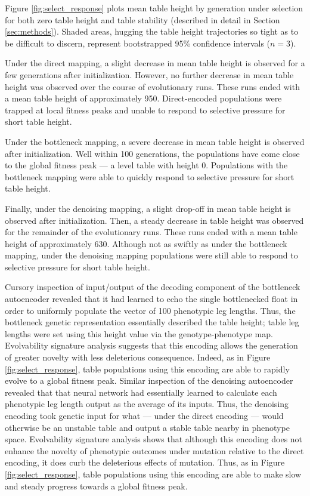 

Figure \ref{fig:select_response} plots mean table height by generation under selection for both zero table height and table stability (described in detail in Section \ref{sec:methods}).
Shaded areas, hugging the table height trajectories so tight as to be difficult to discern, represent bootstrapped 95\% confidence intervals ($n=3$).

Under the direct mapping, a slight decrease in mean table height is observed for a few generations after initialization.
However, no further decrease in mean table height was observed over the course of evolutionary runs.
These runs ended with a mean table height of approximately 950.
Direct-encoded populations were trapped at local fitness peaks and unable to respond to selective pressure for short table height.

Under the bottleneck mapping, a severe decrease in mean table height is observed after initialization.
Well within 100 generations, the populations have come close to the global fitness peak --- a level table with height 0.
Populations with the bottleneck mapping were able to quickly respond to selective pressure for short table height.

Finally, under the denoising mapping, a slight drop-off in mean table height is observed after initialization.
Then, a steady decrease in table height was observed for the remainder of the evolutionary runs.
These runs ended with a mean table height of approximately 630.
Although not as swiftly as under the bottleneck mapping, under the denoising mapping populations were still able to respond to selective pressure for short table height.

Cursory inspection of input/output of the decoding component of the bottleneck autoencoder revealed that it had learned to echo the single bottlenecked float in order to uniformly populate the vector of 100 phenotypic leg lengths.
Thus, the bottleneck genetic representation essentially described the table height; table leg lengths were set using this height value via the genotype-phenotype map.
Evolvability signature analysis suggests that this encoding allows the generation of greater novelty with less deleterious consequence.
Indeed, as in Figure \ref{fig:select_response}, table populations using this encoding are able to rapidly evolve to a global fitness peak.
Similar inspection of the denoising autoencoder revealed that that neural network had essentially learned to calculate each phenotypic leg length output as the average of its inputs.
Thus, the denoising encoding took genetic input for what --- under the direct encoding --- would otherwise be an unstable table and output a stable table nearby in phenotype space.
Evolvability signature analysis shows that although this encoding does not enhance the novelty of phenotypic outcomes under mutation relative to the direct encoding, it does curb the deleterious effects of mutation.
Thus, as in Figure \ref{fig:select_response}, table populations using this encoding are able to make slow and steady progress towards a global fitness peak.

